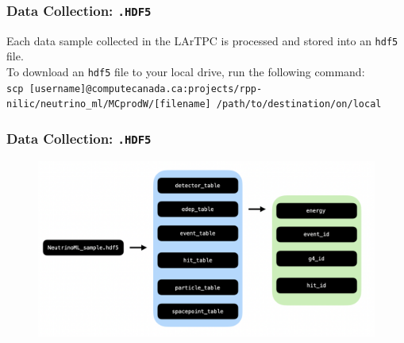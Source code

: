 \documentclass{beamer}
\begin{document}
\begin{frame}
	\frametitle{Data Collection: \texttt{.HDF5}}
	Each data sample collected in the LArTPC is processed and stored into an \texttt{hdf5} file.\\[0.20cm]

	To download an \texttt{hdf5} file to your local drive, run the following command:\\[0.20cm]

	\tiny{\texttt{scp [username]@computecanada.ca:projects/rpp-nilic/neutrino\_ml/MCprodW/[filename] /path/to/destination/on/local}}
\end{frame}


\begin{frame}
	\frametitle{Data Collection: \texttt{.HDF5}}
	\begin{figure}[h!]
		\includegraphics[width=.8\textwidth]{images/hdf5.png}
	\end{figure}
\end{frame}
\end{document}
